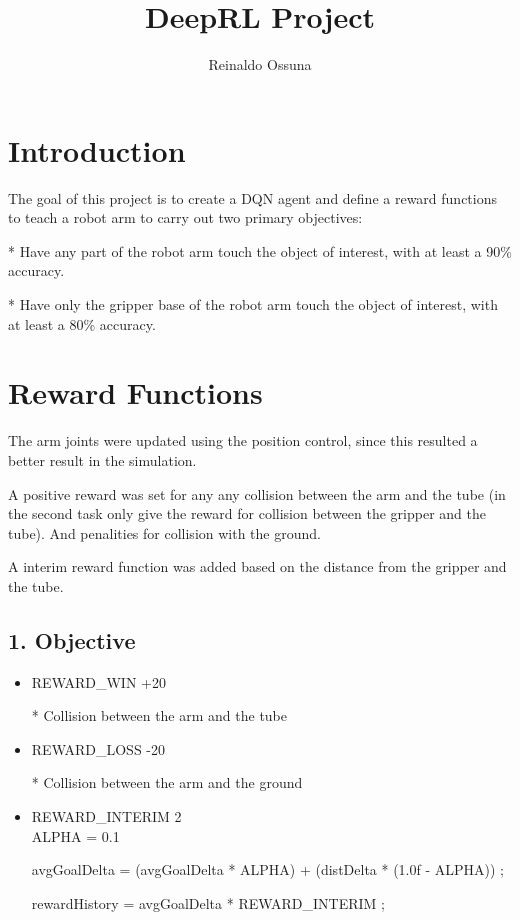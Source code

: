 \documentclass[12pt]{extarticle}
\title{DeepRL Project}
\author{Reinaldo Ossuna}
\begin{document}
\maketitle

\section{Introduction}

The goal of this project is to create a DQN agent and define a reward functions to teach a robot arm to carry out two
primary objectives:

* Have any part of the robot arm touch the object of interest, with at least a 90\% accuracy.

* Have only the gripper base of the robot arm touch the object of interest, with at least a 80\% accuracy.


\section{Reward Functions}

The arm joints were updated using the position control, since this resulted a better result in the simulation.

A positive reward was set for any any collision between the arm and the tube (in the second task only give the reward
for collision between the gripper and the tube). And penalities for collision with the ground.

A interim reward function was added based on the distance from the gripper and the tube.

\subsection{1. Objective}


\begin{itemize}
  \item REWARD\_WIN +20
    
    * Collision between the arm and the tube
  \item REWARD\_LOSS -20

    * Collision between the arm and the ground
   \item REWARD\_INTERIM 2 \\ ALPHA = 0.1



				avgGoalDelta  = (avgGoalDelta * ALPHA) + (distDelta * (1.0f - ALPHA)) ;

				   rewardHistory = avgGoalDelta * REWARD\_INTERIM ;

\end{itemize}
\end{document}
